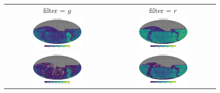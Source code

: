 \documentclass[preprintm,linenumbers]{aastex631}
\begin{document}
\begin{figure}
   		\centering
			\begin{tabular}{c c}
          filter = $g$ &  filter = $r$\\
   		\includegraphics[width=0.5\textwidth]{results/skymaps_cutout/skymaps_cutout_first_year_one_snap_v4_0_10yrs_db_noDD_noTwi_nside-256_CountMetric_g_noDD_noTwi.pdf} &
   		\includegraphics[width=0.5\textwidth]{results/skymaps_cutout/skymaps_cutout_first_year_one_snap_v4_0_10yrs_db_noDD_noTwi_nside-256_CountMetric_r_noDD_noTwi.pdf} \\

         \includegraphics[width=0.5\textwidth]{results/skymaps_cutout/skymaps_cutout_first_year_one_snap_v4_0_10yrs_db_noDD_noTwi_tscale-7_nside-256_doAllTemplateMetrics_reduceCount_g_noDD_noTwi.pdf} &
         \includegraphics[width=0.5\textwidth]{results/skymaps_cutout/skymaps_cutout_first_year_one_snap_v4_0_10yrs_db_noDD_noTwi_tscale-7_nside-256_doAllTemplateMetrics_reduceCount_r_noDD_noTwi.pdf} \\


\end{tabular}
\end{figure}
\end{document}
